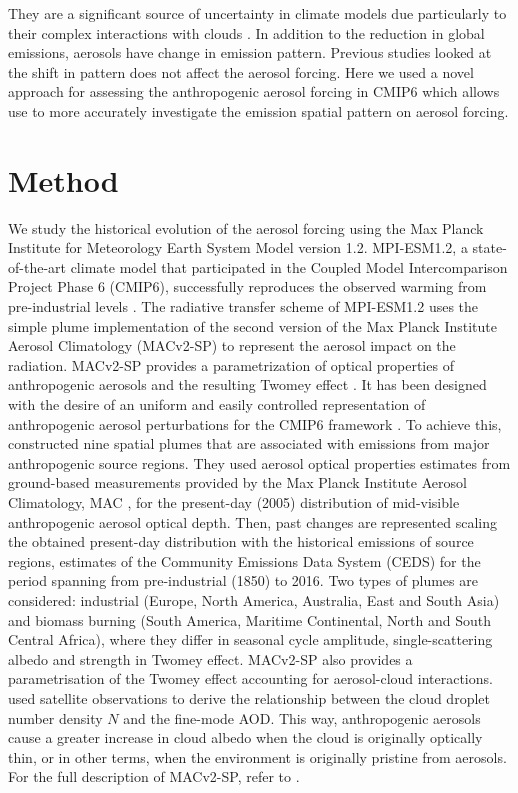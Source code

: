 \documentclass[draft]{agujournal2019}
\begin{document}
      They are a significant source of uncertainty in climate models due particularly to their complex interactions with clouds \cite{Bellouin_2020}. 
      In addition to the reduction in global emissions, aerosols have change in emission pattern. Previous studies looked at the shift in pattern does not affect the aerosol forcing. 
      Here we used a novel approach for assessing the anthropogenic aerosol forcing in CMIP6 which allows use to more accurately investigate the emission spatial pattern on aerosol forcing. 

\section{Method}\label{sec:method}
      We study the historical evolution of the aerosol forcing using the Max Planck Institute for Meteorology Earth System Model version 1.2. MPI-ESM1.2, a state-of-the-art climate model \cite{Mauritsen_2019} that participated in the Coupled Model Intercomparison Project Phase 6 (CMIP6), successfully reproduces the observed warming from pre-industrial levels \cite{Mauritsen_2020}.
      The radiative transfer scheme of MPI-ESM1.2 uses the simple plume implementation of the second version of the Max Planck Institute Aerosol Climatology (MACv2-SP) to represent the aerosol impact on the radiation. MACv2-SP provides a parametrization of optical properties of anthropogenic aerosols and the resulting Twomey effect \cite{Stevens_2017}. It has been designed with the desire of an uniform and easily controlled representation of anthropogenic aerosol perturbations for the CMIP6 framework \cite{Pincus_2016}. To achieve this,  constructed nine spatial plumes that are associated with emissions from major anthropogenic source regions. They used aerosol optical properties estimates from ground-based measurements provided by the Max Planck Institute Aerosol Climatology, MAC \cite{Kinne_2013}, for the present-day (2005) distribution of mid-visible anthropogenic aerosol optical depth. Then, past changes are represented scaling the obtained present-day distribution with the historical emissions of source regions, estimates of the Community Emissions Data System (CEDS) for the period spanning from pre-industrial (1850) to 2016. Two types of plumes are considered: industrial (Europe, North America, Australia, East and South Asia) and biomass burning (South America, Maritime Continental, North and South Central Africa), where they differ in seasonal cycle amplitude, single-scattering albedo and strength in Twomey effect. 
      MACv2-SP also provides a parametrisation of the Twomey effect accounting for aerosol-cloud interactions.  used satellite observations to derive the relationship between the cloud droplet number density $N$ and the fine-mode AOD. This way, anthropogenic aerosols cause a greater increase in cloud albedo when the cloud is originally optically thin, or in other terms, when the environment is originally pristine from aerosols.
      For the full description of MACv2-SP, refer to .
\end{document}
